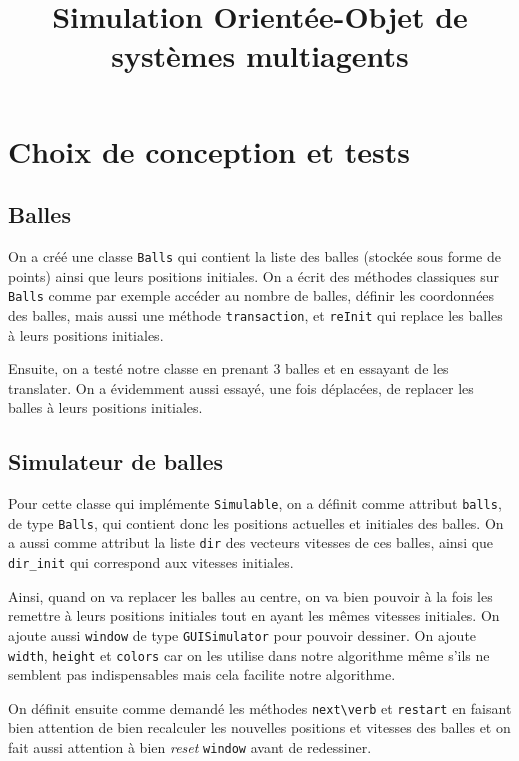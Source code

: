 \documentclass[a4paper, 11pt, french]{article}
\title{Simulation Orientée-Objet de systèmes multiagents}
\author{}
\date{}
\begin{document}
\maketitle

\section{Choix de conception et tests}

\subsection{Balles}

On a créé une classe \verb|Balls| qui contient la liste des balles (stockée sous forme de points) ainsi que leurs positions initiales. On a écrit des méthodes classiques sur \verb|Balls| comme par exemple accéder au nombre de balles, définir les coordonnées des balles, mais aussi une méthode \verb|transaction|, et \verb|reInit| qui replace les balles à leurs positions initiales.

Ensuite, on a testé notre classe en prenant 3 balles et en essayant de les translater. On a évidemment aussi essayé, une fois déplacées, de replacer les balles à leurs positions initiales.

\subsection{Simulateur de balles}

Pour cette classe qui implémente \verb|Simulable|, on a définit comme attribut \verb|balls|, de type \verb|Balls|, qui contient donc les positions actuelles et initiales des balles. On a aussi comme attribut la liste \verb|dir| des vecteurs vitesses de ces balles, ainsi que \verb|dir_init| qui correspond aux vitesses initiales.

Ainsi, quand on va replacer les balles au centre, on va bien pouvoir à la fois les remettre à leurs positions initiales tout en ayant les mêmes vitesses initiales. On ajoute aussi \verb|window| de type \verb|GUISimulator| pour pouvoir dessiner. On ajoute \verb|width|, \verb|height| et \verb|colors| car on les utilise dans notre algorithme même s'ils ne semblent pas indispensables mais cela facilite notre algorithme.

On définit ensuite comme demandé les méthodes \verb|next\verb| et \verb|restart| en faisant bien attention de bien recalculer les nouvelles positions et vitesses des balles et on fait aussi attention à bien \textit{reset} \verb|window| avant de redessiner.
\end{document}

